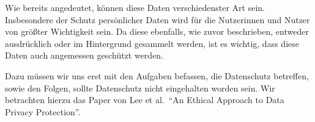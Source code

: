 Wie bereits angedeutet, können diese Daten verschiedenster Art sein.
Insbesondere der Schutz persönlicher Daten wird für die Nutzerinnen und Nutzer von größter Wichtigkeit sein.
Da diese ebenfalls, wie zuvor beschrieben, entweder ausdrücklich oder im Hintergrund gesammelt werden,
ist es wichtig, dass diese Daten auch angemessen geschützt werden.

Dazu müssen wir uns erst mit den Aufgaben befassen, die Datenschutz betreffen, sowie den Folgen, sollte Datenschutz nicht eingehalten worden sein.
Wir betrachten hierzu das Paper von Lee et al.\ \enquote{An Ethical Approach to Data Privacy Protection}. \cite{lee_ethical_2016}



